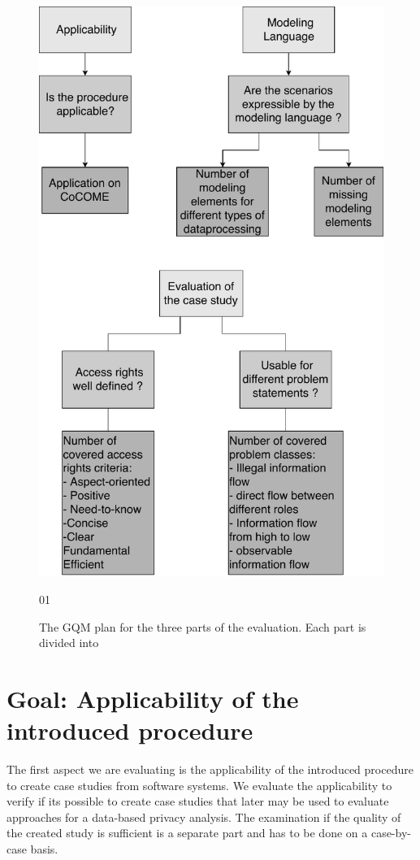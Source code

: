 \begin{figure}
\includegraphics[scale=.8, origin=c ]{logos/OverviewEval.pdf}
\caption{The GQM plan for the three parts of the evaluation. Each part is divided into }01
\label{GQMPlan}
\end{figure}

\section{Goal: Applicability of the introduced procedure}
The first aspect we are evaluating is the applicability of the introduced procedure to create case studies from software systems. We evaluate the applicability to verify if its possible to create case studies that later may be used to evaluate approaches for a data-based privacy analysis. The examination if the quality of the created study is sufficient is a separate part and has to be done on a case-by-case basis.  
